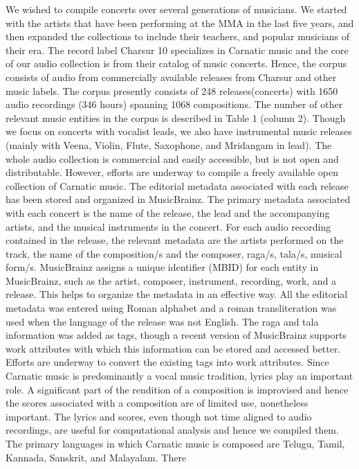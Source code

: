 We wished to compile concerts over several generations
of musicians. We started with the artists that have been
performing at the MMA in the last five years, and then expanded
the collections to include their teachers, and popular
musicians of their era. The record label Charsur 10 specializes
in Carnatic music and the core of our audio collection
is from their catalog of music concerts. Hence, the corpus
consists of audio from commercially available releases
from Charsur and other music labels. The corpus presently
consists of 248 releases(concerts) with 1650 audio recordings
(346 hours) spanning 1068 compositions. The number
of other relevant music entities in the corpus is described
in Table 1 (column 2). Though we focus on concerts with
vocalist leads, we also have instrumental music releases
(mainly with Veena, Violin, Flute, Saxophone, and Mridangam
in lead). The whole audio collection is commercial
and easily accessible, but is not open and distributable.
However, efforts are underway to compile a freely available
open collection of Carnatic music.
The editorial metadata associated with each release has
been stored and organized in MusicBrainz. The primary
metadata associated with each concert is the name of the
release, the lead and the accompanying artists, and the musical
instruments in the concert. For each audio recording
contained in the release, the relevant metadata are the artists
performed on the track, the name of the composition/s and
the composer, raga/s, tala/s, musical form/s. MusicBrainz
assigns a unique identifier (MBID) for each entity in MusicBrainz,
such as the artist, composer, instrument, recording,
work, and a release. This helps to organize the metadata
in an effective way. All the editorial metadata was entered
using Roman alphabet and a roman transliteration was
used when the language of the release was not English. The
raga and tala information was added as tags, though a recent
version of MusicBrainz supports work attributes with
which this information can be stored and accessed better.
Efforts are underway to convert the existing tags into work
attributes.
Since Carnatic music is predominantly a vocal music tradition,
lyrics play an important role. A significant part of
the rendition of a composition is improvised and hence the
scores associated with a composition are of limited use,
nonetheless important. The lyrics and scores, even though
not time aligned to audio recordings, are useful for computational
analysis and hence we compiled them. The primary
languages in which Carnatic music is composed are
Telugu, Tamil, Kannada, Sanskrit, and Malayalam. There
